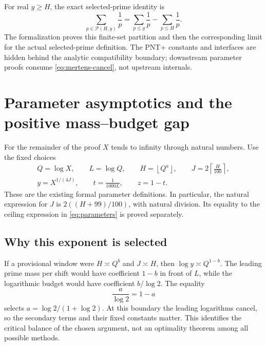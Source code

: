 \documentclass[11pt,a4paper]{article}
\theoremstyle{definition}
\theoremstyle{remark}
\numberwithin{equation}{section}
\newcommand{\Pset}{\mathcal P}
\newcommand{\floor}[1]{\left\lfloor #1\right\rfloor}
\newcommand{\ceil}[1]{\left\lceil #1\right\rceil}
\begin{document}
For real $y\ge H$, the exact selected-prime identity is
\begin{equation}\label{eq:prime-difference}
 \sum_{p\in\Pset(H,y)}\frac1p
 =\sum_{p\le y}\frac1p-\sum_{p\le H}\frac1p.
\end{equation}
The formalization proves this finite-set partition and then the corresponding
limit for the actual selected-prime definition. The PNT+ constants and
interfaces are hidden behind the analytic compatibility boundary; downstream
parameter proofs consume \eqref{eq:mertens-cancel}, not upstream internals.

\section{Parameter asymptotics and the positive mass--budget gap}\label{sec:parameters}
For the remainder of the proof $X$ tends to infinity through natural numbers.
Use the fixed choices
\begin{equation}\label{eq:parameters}
 \begin{gathered}
 Q=\log X,\qquad L=\log Q,\qquad
 H=\floor{Q^a},\qquad
 J=2\ceil{\frac H{100}},\\
 y=X^{1/(4J)},\qquad t=\frac1{1000L},\qquad z=1-t.
 \end{gathered}
\end{equation}
These are the existing formal parameter definitions. In particular, the natural
expression for $J$ is $2((H+99)/100)$, with natural division. Its equality to the
ceiling expression in \eqref{eq:parameters} is proved separately.

\subsection{Why this exponent is selected}
If a provisional window were $H\asymp Q^b$ and $J\asymp H$, then
$\log y\asymp Q^{1-b}$. The leading prime mass per shift would have coefficient
$1-b$ in front of $L$, while the logarithmic budget would have coefficient
$b/\log2$. The equality
\begin{equation}\label{eq:critical}
 \frac a{\log2}=1-a
\end{equation}
selects $a=\log2/(1+\log2)$. At this boundary the leading logarithms cancel,
so the secondary terms and their fixed constants matter. This identifies the
critical balance of the chosen argument, not an optimality theorem among all
possible methods.
\end{document}
